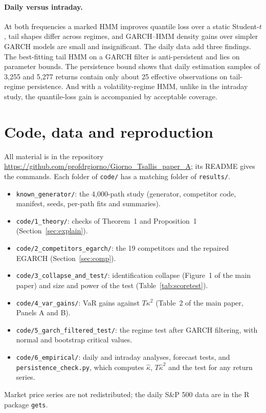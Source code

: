 \documentclass[11pt,a4paper]{article}
\theoremstyle{plain}
\theoremstyle{remark}
\begin{document}
\paragraph{Daily versus intraday.} At both frequencies a marked HMM improves quantile loss over a static Student-$t$, tail shapes differ across regimes, and GARCH--HMM density gains over simpler GARCH models are small and insignificant. The daily data add three findings. The best-fitting tail HMM on a GARCH filter is anti-persistent and lies on parameter bounds. The persistence bound shows that daily estimation samples of 3{,}255 and 5{,}277 returns contain only about 25 effective observations on tail-regime persistence. And with a volatility-regime HMM, unlike in the intraday study, the quantile-loss gain is accompanied by acceptable coverage.

\section{Code, data and reproduction}\label{sec:code}
All material is in the repository \url{https://github.com/profdrgiorno/Giorno_Tsallis_paper_A}; its README gives the commands. Each folder of \texttt{code/} has a matching folder of \texttt{results/}.
\begin{itemize}\raggedright
\item \texttt{known\_generator/}: the 4{,}000-path study (generator, competitor code, manifest, seeds, per-path fits and summaries).
\item \texttt{code/1\_theory/}: checks of Theorem~1 and Proposition~1 (Section~\ref{sec:explain}).
\item \texttt{code/2\_competitors\_egarch/}: the 19 competitors and the repaired EGARCH (Section~\ref{sec:comp}).
\item \texttt{code/3\_collapse\_and\_test/}: identification collapse (Figure~1 of the main paper) and size and power of the test (Table~\ref{tab:scoretest}).
\item \texttt{code/4\_var\_gains/}: VaR gains against $T\kappa^2$ (Table~2 of the main paper, Panels A and B).
\item \texttt{code/5\_garch\_filtered\_test/}: the regime test after GARCH filtering, with normal and bootstrap critical values.
\item \texttt{code/6\_empirical/}: daily and intraday analyses, forecast tests, and \texttt{persistence\_check.py}, which computes $\hat\kappa$, $T\hat\kappa^2$ and the test for any return series.
\end{itemize}
Market price series are not redistributed; the daily S\&P 500 data are in the R package \texttt{gets}.
\end{document}
